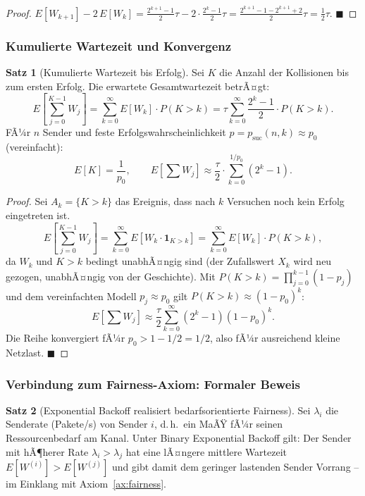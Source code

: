 ﻿\documentclass[a4paper,12pt]{article}
\theoremstyle{definition}
\newtheorem{satz}{Satz}
\begin{document}
\begin{proof}
$E[W_{k+1}] - 2\,E[W_k]
= \frac{2^{k+1}-1}{2}\tau - 2\cdot\frac{2^k-1}{2}\tau
= \frac{2^{k+1}-1-2^{k+1}+2}{2}\tau
= \frac{1}{2}\tau$.
\hfill$\blacksquare$
\end{proof}

\subsubsection{Kumulierte Wartezeit und Konvergenz}

\begin{satz}[Kumulierte Wartezeit bis Erfolg]
\label{satz:kumuliert}
Sei $K$ die Anzahl der Kollisionen bis zum ersten Erfolg.
Die erwartete Gesamtwartezeit betrÃ¤gt:
\[
  E\!\left[\sum_{j=0}^{K-1} W_j\right]
  = \sum_{k=0}^{\infty} E[W_k] \cdot P(K > k)
  = \tau \sum_{k=0}^{\infty} \frac{2^k - 1}{2} \cdot P(K > k).
\]
FÃ¼r $n$ Sender und feste Erfolgswahrscheinlichkeit
$p = p_{\mathrm{suc}}(n, k) \approx p_0$ (vereinfacht):
\[
  E[K] = \frac{1}{p_0}, \qquad
  E\!\left[\sum W_j\right] \approx \frac{\tau}{2} \cdot
  \sum_{k=0}^{1/p_0} (2^k - 1).
\]
\end{satz}

\begin{proof}
Sei $A_k = \{K > k\}$ das Ereignis, dass nach $k$ Versuchen noch kein
Erfolg eingetreten ist.
\[
  E\!\left[\sum_{j=0}^{K-1} W_j\right]
  = \sum_{k=0}^{\infty} E[W_k \cdot \mathbf{1}_{K>k}]
  = \sum_{k=0}^{\infty} E[W_k] \cdot P(K > k),
\]
da $W_k$ und $K > k$ bedingt unabhÃ¤ngig sind (der Zufallswert
$X_k$ wird neu gezogen, unabhÃ¤ngig von der Geschichte).
Mit $P(K > k) = \prod_{j=0}^{k-1}(1-p_j)$ und dem vereinfachten
Modell $p_j \approx p_0$ gilt $P(K > k) \approx (1-p_0)^k$:
\[
  E\!\left[\sum W_j\right]
  \approx \frac{\tau}{2} \sum_{k=0}^{\infty} (2^k - 1)(1-p_0)^k.
\]
Die Reihe konvergiert fÃ¼r $p_0 > 1 - 1/2 = 1/2$, also fÃ¼r
ausreichend kleine Netzlast.
\hfill$\blacksquare$
\end{proof}

\subsubsection{Verbindung zum Fairness-Axiom: Formaler Beweis}

\begin{satz}[Exponential Backoff realisiert bedarfsorientierte Fairness]
\label{satz:backoff_fairness}
Sei $\lambda_i$ die Senderate (Pakete/s) von Sender $i$, d.\,h.\ ein
MaÃŸ fÃ¼r seinen Ressourcenbedarf am Kanal.
Unter Binary Exponential Backoff gilt: Der Sender mit hÃ¶herer Rate
$\lambda_i > \lambda_j$ hat eine lÃ¤ngere mittlere Wartezeit
$E[W^{(i)}] > E[W^{(j)}]$ und gibt damit dem geringer lastenden
Sender Vorrang -- im Einklang mit Axiom~\ref{ax:fairness}.
\end{satz}
\end{document}
